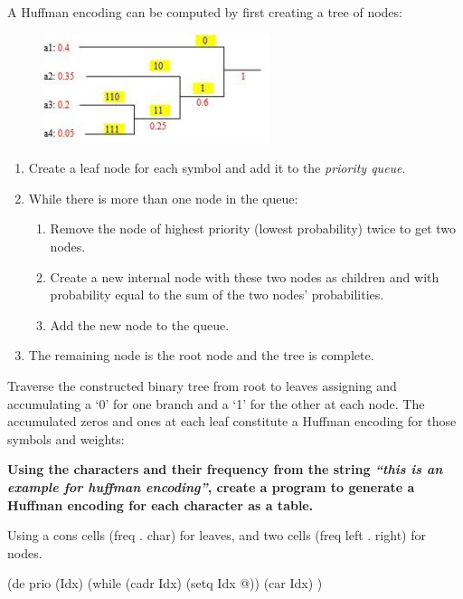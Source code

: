 \begin{itemize}
A Huffman encoding can be computed by first creating a tree of nodes:

\begin{figure}[H]
\centering
\includegraphics[scale=.6]{graphics/250px-Huffman_coding_example.jpg}
\end{figure}


\begin{enumerate}
\item
  Create a leaf node for each symbol and add it to the
  \emph{priority queue}.
\item
  While there is more than one node in the queue:

  \begin{enumerate}
  \item
    Remove the node of highest priority (lowest probability) twice to
    get two nodes.
  \item
    Create a new internal node with these two nodes as children and with
    probability equal to the sum of the two nodes' probabilities.
  \item
    Add the new node to the queue.
  \end{enumerate}
\item
  The remaining node is the root node and the tree is complete.
\end{enumerate}

Traverse the constructed binary tree from root to leaves assigning and
accumulating a `0' for one branch and a `1' for the other at each node.
The accumulated zeros and ones at each leaf constitute a Huffman
encoding for those symbols and weights:

\textbf{Using the characters and their frequency from the string
\emph{``this is an example for huffman encoding''}, create a program to
generate a Huffman encoding for each character as a table.}


\begin{wideverbatim}

Using a cons cells (freq . char) for leaves, and two cells (freq left . right)
for nodes.

(de prio (Idx)
   (while (cadr Idx) (setq Idx @))
   (car Idx) )


\end{wideverbatim}
\end{itemize}
